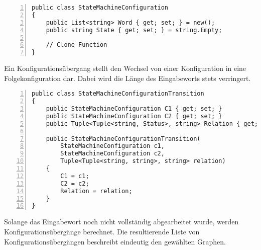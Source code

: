 \begin{lstlisting}[language={[Sharp]C}, breaklines=true, tabsize=2, showstringspaces=false, frame=single, numbers=left, basicstyle=\small,label = {lst:statemachineconfiguration-csharp}, caption={Modellierung einer StateMachineConfiguration in C\#}, captionpos=b] 
public class StateMachineConfiguration
{
	public List<string> Word { get; set; } = new();
	public string State { get; set; } = string.Empty;
	
	// Clone Function
}
\end{lstlisting}

Ein Konfigurationsübergang stellt den Wechsel von einer Konfiguration in eine Folgekonfiguration dar. Dabei wird die Länge des Eingabeworts stets verringert.

\begin{lstlisting}[language={[Sharp]C}, breaklines=true, tabsize=2, showstringspaces=false, frame=single, numbers=left, basicstyle=\small,label = {lst:statemachineconfigurationtransition-csharp}, caption={Modellierung einer StateMachineConfigurationTransition in C\#}, captionpos=b] 
public class StateMachineConfigurationTransition
{
	public StateMachineConfiguration C1 { get; set; }
	public StateMachineConfiguration C2 { get; set; }
	public Tuple<Tuple<string, Status>, string> Relation { get; set; }
	
	public StateMachineConfigurationTransition(
		StateMachineConfiguration c1, 
		StateMachineConfiguration c2, 
		Tuple<Tuple<string, string>, string> relation)
	{
		C1 = c1;
		C2 = c2;
		Relation = relation;
	}
}
\end{lstlisting}

Solange das Eingabewort noch nicht vollständig abgearbeitet wurde, werden Konfigurationsübergänge berechnet. Die resultierende Liste von Konfigurationsübergängen beschreibt eindeutig den gewählten Graphen. 

